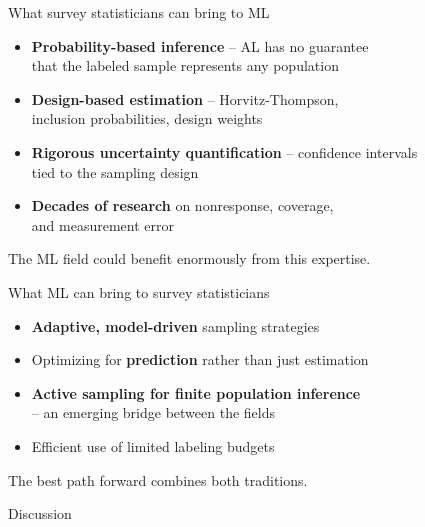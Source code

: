 \documentclass[aspectratio=169,11pt]{beamer}
\begin{document}
\begin{frame}{What survey statisticians can bring to ML}

\begin{itemize}
  \item \textbf{Probability-based inference} -- AL has no guarantee\\
        that the labeled sample represents any population
  \item \textbf{Design-based estimation} -- Horvitz-Thompson,\\
        inclusion probabilities, design weights
  \item \textbf{Rigorous uncertainty quantification} -- confidence intervals\\
        tied to the sampling design
  \item \textbf{Decades of research} on nonresponse, coverage,\\
        and measurement error
\end{itemize}

\vspace{1em}

The ML field could benefit enormously from this expertise.
\end{frame}

\begin{frame}{What ML can bring to survey statisticians}

\begin{itemize}
  \item \textbf{Adaptive, model-driven} sampling strategies
  \item Optimizing for \textbf{prediction} rather than just estimation
  \item \textbf{Active sampling for finite population inference}\\
        -- an emerging bridge between the fields
  \item Efficient use of limited labeling budgets
\end{itemize}

\vspace{1em}

The best path forward combines both traditions.
\end{frame}

\begin{frame}[standout]
Discussion
\end{frame}
\end{document}
